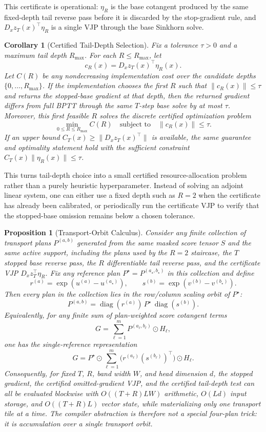 \documentclass{article}
\newtheorem{proposition}{Proposition}
\newtheorem{corollary}{Corollary}
\begin{document}
This certificate is operational: $\eta_R$ is the base cotangent produced by the same fixed-depth tail reverse pass before it is discarded by the stop-gradient rule, and $D_xz_T(x)^\top\eta_R$ is a single VJP through the base Sinkhorn solve.

\begin{corollary}[Certified Tail-Depth Selection]\label{cor:certified_tail_depth}
Fix a tolerance $\tau>0$ and a maximum tail depth $R_{\max}$. For each $R\le R_{\max}$, let
\[
c_R(x)=D_xz_T(x)^\top\eta_R(x).
\]
Let $C(R)$ be any nondecreasing implementation cost over the candidate depths $\{0,\ldots,R_{\max}\}$. If the implementation chooses the first $R$ such that $\|c_R(x)\|\le \tau$ and returns the stopped-base gradient at that depth, then the returned gradient differs from full BPTT through the same $T$-step base solve by at most $\tau$. Moreover, this first feasible $R$ solves the discrete certified optimization problem
\[
\min_{0\le R\le R_{\max}} C(R)
\quad\text{subject to}\quad
\|c_R(x)\|\le \tau .
\]
If an upper bound $C_T(x)\ge\|D_xz_T(x)^\top\|$ is available, the same guarantee and optimality statement hold with the sufficient constraint $C_T(x)\|\eta_R(x)\|\le\tau$.
\end{corollary}

This turns tail-depth choice into a small certified resource-allocation problem rather than a purely heuristic hyperparameter. Instead of solving an adjoint linear system, one can either use a fixed depth such as $R=2$ when the certificate has already been calibrated, or periodically run the certificate VJP to verify that the stopped-base omission remains below a chosen tolerance.

\begin{proposition}[Transport-Orbit Calculus]\label{prop:orbit_certificate}
Consider any finite collection of transport plans $P^{(a,b)}$ generated from the same masked score tensor $S$ and the same active support, including the plans used by the $R=2$ staircase, the $T$ stopped base reverse pass, the $R$ differentiable tail reverse pass, and the certificate VJP $D_xz_T^\top\eta_R$. Fix any reference plan $P^\star=P^{(a_\star,b_\star)}$ in this collection and define
\[
r^{(a)}=\exp(u^{(a)}-u^{(a_\star)}),
\qquad
s^{(b)}=\exp(v^{(b)}-v^{(b_\star)}).
\]
Then every plan in the collection lies in the row/column scaling orbit of $P^\star$:
\[
P^{(a,b)}
=
\operatorname{diag}(r^{(a)})\,P^\star\,\operatorname{diag}(s^{(b)}).
\]
Equivalently, for any finite sum of plan-weighted score cotangent terms
\[
G=\sum_{\ell=1}^m P^{(a_\ell,b_\ell)}\odot H_\ell ,
\]
one has the single-reference representation
\[
G
=
P^\star\odot
\sum_{\ell=1}^m
\bigl(r^{(a_\ell)}(s^{(b_\ell)})^\top\bigr)
\odot H_\ell .
\]
Consequently, for fixed $T$, $R$, band width $W$, and head dimension $d$, the stopped gradient, the certified omitted-gradient VJP, and the certified tail-depth test can all be evaluated blockwise with $O((T+R)LW)$ arithmetic, $O(Ld)$ input storage, and $O((T+R)L)$ vector state, while materializing only one transport tile at a time. The compiler abstraction is therefore not a special four-plan trick: it is accumulation over a single transport orbit.
\end{proposition}
\end{document}
